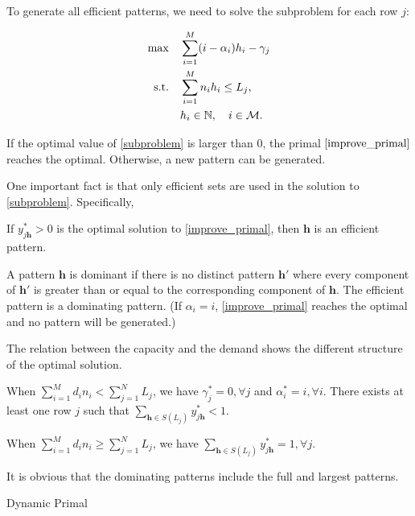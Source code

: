 To generate all efficient patterns, we need to solve the subproblem for each row $j$:

\begin{align}\label{subproblem}
    \max \quad & \sum_{i=1}^{M} (i - \alpha_{i}) h_{i} - \gamma_{j} \\
    \text {s.t.} \quad & \sum_{i= 1}^{M} n_{i} h_{i} \leq L_j, \notag \\
    & h_{i} \in \mathbb{N}, \quad i \in \mathcal{M}. \notag
\end{align} 

If the optimal value of \eqref{subproblem} is larger than $0$, the primal $\eqref{improve_primal}$ reaches the optimal. Otherwise, a new pattern can be generated.

One important fact is that only efficient sets are used in the solution to \eqref{subproblem}. Specifically, 

\begin{lem}
    If $y_{j \bm{h}}^{*} > 0$ is the optimal solution to \eqref{improve_primal}, then $\bm{h}$ is an efficient pattern.
\end{lem}


A pattern $\bm{h}$ is dominant if there is no distinct pattern $\bm{h}{'}$ where every component of $\bm{h}{'}$ is greater than or equal to the corresponding component of $\bm{h}$. The efficient pattern is a dominating pattern. (If $\alpha_{i} = i$, \eqref{improve_primal} reaches the optimal and no pattern will be generated.)

The relation between the capacity and the demand shows the different structure of the optimal solution.

\begin{lem}
When $\sum_{i=1}^{M} d_{i} n_{i} < \sum_{j=1}^{N} L_{j}$, we have $\gamma_{j}^{*} =0, \forall j$ and $\alpha^{*}_{i} = i, \forall i$. There exists at least one row $j$ such that $\sum_{\bm{h} \in S(L_{j})} y_{j \bm{h}}^{*} < 1$.

When $\sum_{i=1}^{M} d_{i} n_{i} \geq \sum_{j=1}^{N} L_{j}$, we have $\sum_{\bm{h} \in S(L_{j})} y_{j \bm{h}}^{*} = 1, \forall j$.
\end{lem}

It is obvious that the dominating patterns include the full and largest patterns.

\begin{algorithm}[H]
    \caption{Dynamic Primal}\label{algo_improve_primal}
\end{algorithm}

